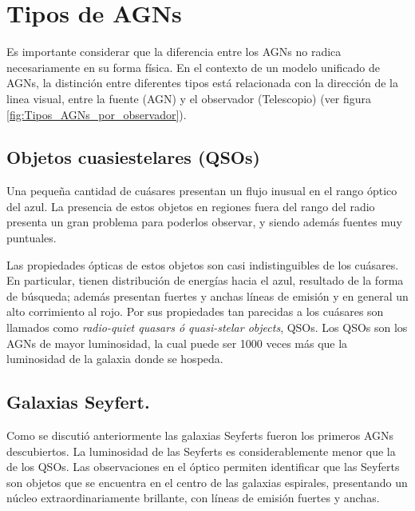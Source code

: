 \section{Tipos de AGNs}
\label{sec: Zoo_AGN's}

Es importante considerar que la diferencia entre los AGNs no radica necesariamente en su forma física. En el contexto de un modelo unificado de AGNs, la distinción entre diferentes tipos está relacionada 
con la dirección de la linea visual, entre la fuente (AGN) y el observador (Telescopio) (ver figura \ref{fig:Tipos_AGNs_por_observador}).


	\subsection{Objetos cuasiestelares (QSOs)}
	\label{subsec:Quasi-Stelar_Objects}

Una pequeña cantidad de cuásares presentan un flujo inusual en el rango óptico del azul. La presencia de estos objetos en regiones fuera del rango del radio presenta un gran problema para poderlos observar, y siendo además fuentes muy puntuales.

Las propiedades ópticas de estos objetos son casi indistinguibles de los cuásares. En particular, tienen distribución de energías hacia el azul, resultado de la forma de búsqueda; además presentan fuertes y anchas líneas de emisión y en general un alto corrimiento al rojo. Por sus propiedades tan parecidas a los cuásares son llamados como {\textit{radio-quiet quasars ó quasi-stelar objects}}, QSOs. Los QSOs son los AGNs de mayor luminosidad, la cual puede ser 1000 veces más que la luminosidad de la galaxia donde se hospeda.

	\subsection{Galaxias Seyfert.}
	\label{subsec:Seyfert_Galaxy}

Como se discutió anteriormente las galaxias Seyferts fueron los primeros AGNs descubiertos. La luminosidad de las Seyferts es considerablemente menor que la de los QSOs. Las observaciones en el óptico permiten identificar que las Seyferts son objetos que se encuentra en el centro de las galaxias espirales, presentando un núcleo extraordinariamente brillante, con líneas de emisión  fuertes y anchas.

